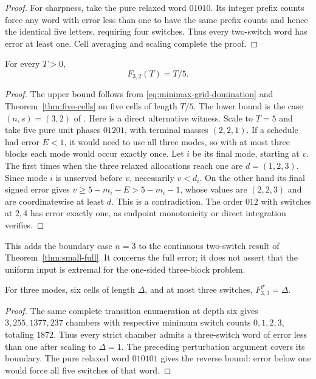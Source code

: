 \begin{proof}
For sharpness, take the pure relaxed word $01010$. Its integer prefix
counts force any word with error less than one to have the same prefix
counts and hence the identical five letters, requiring four switches.
Thus every two-switch word has error at least one. Cell averaging and
scaling complete the proof.
\end{proof}

\begin{corollary}\label{cor:three-two-continuous}
For every $T>0$,
\begin{equation}\label{eq:three-two-continuous}
 F_{3,2}(T)=T/5.
\end{equation}
\end{corollary}
\begin{proof}
The upper bound follows from \eqref{eq:minimax-grid-domination} and
Theorem~\ref{thm:five-cells} on five cells of length $T/5$.
The lower bound is the case $(n,s)=(3,2)$ of
\citet[Proposition~4, p.~612, equation~(7.4)]{sager-zeile2021}.
Here is a direct alternative witness. Scale to $T=5$ and take five pure
unit phases $01201$, with terminal masses $(2,2,1)$.
If a schedule had error $E<1$, it would need to use all three modes,
so with at most three blocks each mode would occur exactly once.
Let $i$ be its final mode, starting at $v$.
The first times when the three relaxed allocations reach one are
$d=(1,2,3)$. Since mode $i$ is unserved before $v$, necessarily
$v<d_i$. On the other hand its final signed error gives
$v\ge5-m_i-E>5-m_i-1$, whose values are $(2,2,3)$ and are
coordinatewise at least $d$. This is a contradiction.
The order $012$ with switches at $2,4$ has error exactly one,
as endpoint monotonicity or direct integration verifies.
\end{proof}
This adds the boundary case $n=3$ to the continuous two-switch result of
Theorem~\ref{thm:small-full}. It concerns the full error; it does not
assert that the uniform input is extremal for the one-sided three-block
problem.

\begin{corollary}\label{cor:six-cells}
For three modes, six cells of length $\Delta$, and at most three switches,
$F^{\mathcal T}_{3,3}=\Delta$.
\end{corollary}
\begin{proof}
The same complete transition enumeration at depth six gives
$3,255,1377,237$ chambers with respective minimum switch counts
$0,1,2,3$, totaling $1872$. Thus every strict chamber admits a
three-switch word of error less than one after scaling to $\Delta=1$.
The preceding perturbation argument covers its boundary.
The pure relaxed word $010101$ gives the reverse bound: error below one
would force all five switches of that word.
\end{proof}

